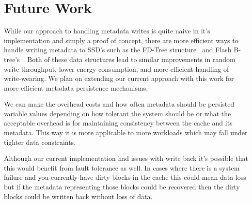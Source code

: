 \section{Future Work}
\label{sec:future}

While our approach to handling metadata writes is quite naive in it's
implementation and simply a proof of concept, there are more efficient
ways to handle writing metadata to SSD's such as the FD-Tree
structure~\cite{FD-Tree} and Flash B-tree's~\cite{FlashB-Tree}. Both
of these data structures lead to similar improvements in random write
throughput, lower energy consumption, and more efficient handling of
write-wearing. We plan on extending our current approach with this
work for more efficient metadata persistence mechanisms.

We can make the overhead costs and how often metadata should be
persisted variable values depending on how tolerant the system should
be or what the acceptable overhead is for maintaining consistency
between the cache and its metadata. This way it is more applicable to
more workloads which may fall under tighter data constraints.

Although our current implementation had issues with write back it's
possible that this would benefit from fault tolerance as well. In
cases where there is a system failure and you currently have dirty
blocks in the cache this could mean data loss but if the metadata
representing those blocks could be recovered then the dirty blocks
could be written back without loss of data.
